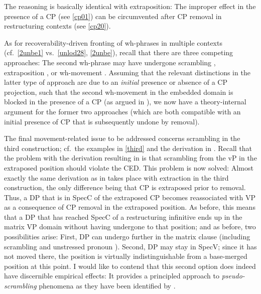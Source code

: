 \documentclass[output=paper]{langsci/langscibook}
\begin{document}
The reasoning is basically identical with extraposition: The improper 
effect in the presence of a CP (see \eqref{cp01}) can be circumvented after CP
removal in restructuring contexts (see \eqref{cp20}).

As for recoverability-driven fronting of wh-phrases in multiple 
contexts (cf.\ \eqref{2unbe1} vs.\ \eqref{unlod28}, \eqref{2unbe}), recall that
there are three competing approaches: The second wh-phrase may have undergone
scrambling \parencite{Sauerland:99:loc}, extraposition
\parencite{Lasnik:14:mul}, or wh-movement \parencite{Heck&Mueller:03:vers}.
Assuming that the relevant distinctions in the latter type of approach are due
to an {\itshape initial} presence or absence of a CP projection, such that the
second wh-movement in the embedded domain is blocked in the presence of a CP
(as argued in \citealt{Heck&Mueller:03:vers}), we now have a theory-internal
argument for the former two approaches (which are both compatible with an
initial presence of CP that is subsequently undone by removal).

The final movement-related issue to be addressed concerns scrambling in the
third construction; cf.\ the examples in \eqref{third} and the derivation in
. Recall that the problem with the derivation resulting in
 is that scrambling from the vP in the extraposed position
should violate the \gls{CED}.  This problem is now solved: Almost exactly the
same derivation as in  takes place with extraction in the third
construction, the only difference being that CP is extraposed prior to removal.
Thus, a DP that is in SpecC of the extraposed CP becomes reassociated with VP
as a consequence of CP removal in the extraposed position. As before, this
means that a DP that has reached SpecC of a restructuring infinitive ends up in
the matrix VP domain without having undergone  to that position; and as
before, two possibilities arise:  First, DP can undergo further  in the
matrix clause (including scrambling and unstressed pronoun ). Second,
DP may stay in SpecV; since it has not moved there, the position is virtually
indistinguishable from a base-merged position at this point. I would like to
contend that this second option does indeed have discernible empirical effects:
It  provides a principled approach to {\itshape pseudo-scrambling} phenomena as they
have been identified by \cite{Geilfuss:91}.
\end{document}
